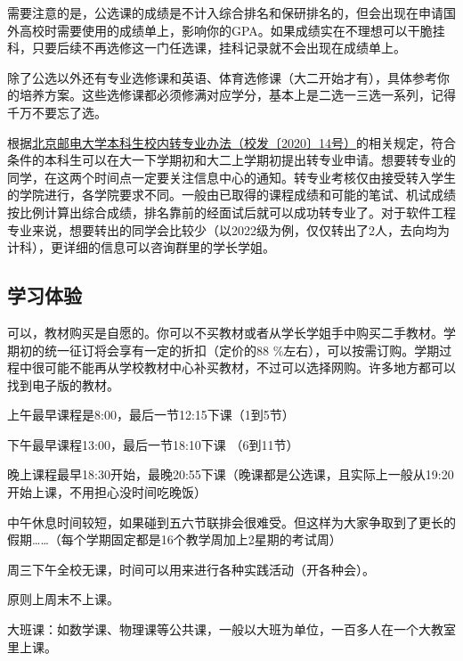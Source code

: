 需要注意的是，公选课的成绩是不计入综合排名和保研排名的，但会出现在申请国外高校时需要使用的成绩单上，影响你的GPA。如果成绩实在不理想可以干脆挂科，只要后续不再选修这一门任选课，挂科记录就不会出现在成绩单上。

除了公选以外还有专业选修课和英语、体育选修课（大二开始才有），具体参考你的培养方案。这些选修课都必须修满对应学分，基本上是二选一三选一系列，记得千万不要忘了选。


根据\href{http://my.bupt.edu.cn/content.jsp?urltype=news.NewsContentUrl&wbtreeid=1036&wbnewsid=25646}{北京邮电大学本科生校内转专业办法（校发〔2020〕14号）}的相关规定，符合条件的本科生可以在大一下学期初和大二上学期初提出转专业申请。想要转专业的同学，在这两个时间点一定要关注信息中心的通知。转专业考核仅由接受转入学生的学院进行，各学院要求不同。一般由已取得的课程成绩和可能的笔试、机试成绩按比例计算出综合成绩，排名靠前的经面试后就可以成功转专业了。对于软件工程专业来说，想要转出的同学会比较少（以2022级为例，仅仅转出了2人，去向均为计科），更详细的信息可以咨询群里的学长学姐。

\subsection{学习体验}


可以，教材购买是自愿的。你可以不买教材或者从学长学姐手中购买二手教材。学期初的统一征订将会享有一定的折扣（定价的88 \%左右），可以按需订购。学期过程中很可能不能再从学校教材中心补买教材，不过可以选择网购。许多地方都可以找到电子版的教材。


上午最早课程是8:00，最后一节12:15下课（1到5节）

下午最早课程13:00，最后一节18:10下课 （6到11节）

晚上课程最早18:30开始，最晚20:55下课（晚课都是公选课，且实际上一般从19:20开始上课，不用担心没时间吃晚饭）

中午休息时间较短，如果碰到五六节联排会很难受。但这样为大家争取到了更长的假期……（每个学期固定都是16个教学周加上2星期的考试周）

周三下午全校无课，时间可以用来进行各种实践活动（开各种会）。

原则上周末不上课。


大班课：如数学课、物理课等公共课，一般以大班为单位，一百多人在一个大教室里上课。

